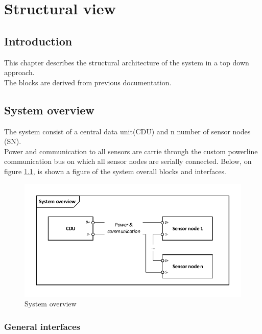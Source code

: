 \chapter{Structural view}

\section{Introduction}
This chapter describes the structural architecture of the system in a top down approach.\\
The blocks are derived from previous documentation.


\section{System overview}
The system consist of a central data unit(CDU) and n number of sensor nodes (SN).\\
Power and communication to all sensors are carrie through the custom powerline communication bus on which all sensor nodes are serially connected. Below, on figure \ref{fig:systembdd}, is shown a figure of the system overall blocks and interfaces.
\begin{figure}[hbpt]
	\centering
	\includegraphics[width=.9\textwidth]{billeder/systembdd}
	\caption{System overview}
	\label{fig:systembdd}
\end{figure}

\subsection{General interfaces}


